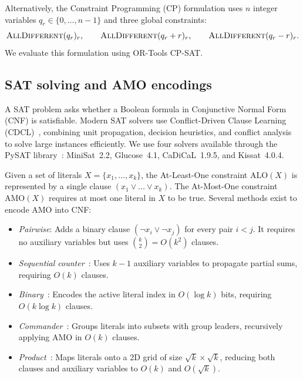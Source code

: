\documentclass[a4paper,fleqn]{cas-sc}
\newcommand{\AMO}{\mathrm{AMO}}
\newcommand{\ALO}{\mathrm{ALO}}
\begin{document}
Alternatively, the Constraint Programming (CP) formulation uses $n$ integer variables $q_r \in \{0,\dots,n-1\}$ and three global constraints:
\begin{equation}\label{eq:cp}
\textsc{AllDifferent}(q_r)_{r},\qquad \textsc{AllDifferent}(q_r+r)_{r},\qquad \textsc{AllDifferent}(q_r-r)_{r}.
\end{equation}
We evaluate this formulation using OR-Tools CP-SAT.

\subsection{SAT solving and AMO encodings}

A SAT problem asks whether a Boolean formula in Conjunctive Normal Form (CNF) is satisfiable. Modern SAT solvers use Conflict-Driven Clause Learning (CDCL)~\citep{marques1999grasp,een2003minisat}, combining unit propagation, decision heuristics, and conflict analysis to solve large instances efficiently. We use four solvers available through the PySAT library~\citep{ignatiev2018pysat}: MiniSat~2.2, Glucose~4.1, CaDiCaL~1.9.5, and Kissat~4.0.4.

Given a set of literals $X=\{x_1,\dots,x_k\}$, the At-Least-One constraint $\ALO(X)$ is represented by a single clause $(x_1\vee\dots\vee x_k)$. The At-Most-One constraint $\AMO(X)$ requires at most one literal in $X$ to be true. Several methods exist to encode AMO into CNF:
\begin{itemize}
\item \emph{Pairwise}: Adds a binary clause $(\neg x_i \lor \neg x_j)$ for every pair $i < j$. It requires no auxiliary variables but uses $\binom{k}{2} = O(k^2)$ clauses.
\item \emph{Sequential counter}~\citep{sinz2005towards}: Uses $k-1$ auxiliary variables to propagate partial sums, requiring $O(k)$ clauses.
\item \emph{Binary}~\citep{frisch2005solving}: Encodes the active literal index in $O(\log k)$ bits, requiring $O(k \log k)$ clauses.
\item \emph{Commander}~\citep{klieber2007efficient}: Groups literals into subsets with group leaders, recursively applying AMO in $O(k)$ clauses.
\item \emph{Product}~\citep{chen2010new}: Maps literals onto a 2D grid of size $\sqrt{k} \times \sqrt{k}$, reducing both clauses and auxiliary variables to $O(k)$ and $O(\sqrt{k})$.
\end{itemize}
\end{document}
